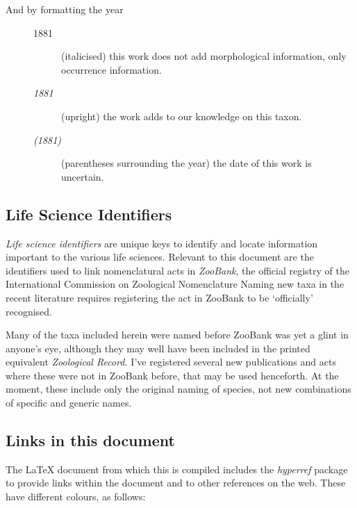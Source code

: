 \begin{description}
\item[And by formatting the year] \par
    \begin{description}
        \item[1881] (italicised) this work does not add morphological
            information, only occurrence information.
        \item[\emph{1881}] (upright) the work adds to our knowledge on this taxon.
        \item[\emph{(1881)}] (parentheses surrounding the year) the date of this work is
            uncertain.
    \end{description}
\end{description}

\subsection{Life Science Identifiers }%
\label{ssec:introduction-lsid}

\emph{Life science
identifiers} are unique keys
to identify and locate information important to the various life sciences.
Relevant to this document are the identifiers used to link nomenclatural acts in
\emph{ZooBank}, the official registry of the International
Commission on Zoological Nomenclature  Naming new taxa in the
recent literature requires registering the act in ZooBank to be ‘officially’
recognised.

Many of the taxa included herein were named before ZooBank was yet a glint in
anyone's eye, although they may well have been included in the printed
equivalent \emph{Zoological Record.} I've registered several new publications
and acts where these were not in ZooBank before, that may be used henceforth. At
the moment, these include only the original naming of species, not new
combinations of specific and generic names.

\subsection{Links in this document}%
\label{sub:introduction-links}

The \LaTeX{} document from which this  is compiled includes the
\emph{hyperref} package to provide links within the
document and to other references on the
web. These have different
colours, as follows:

